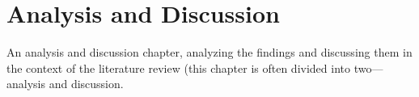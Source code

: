 \chapter{Analysis and Discussion}
An analysis and discussion chapter, analyzing the findings and discussing them in the context of the literature review (this chapter is often divided into two—analysis and discussion.